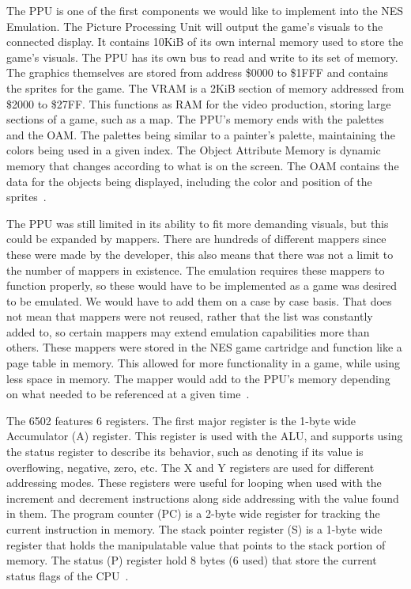 \documentclass[12pt]{article}
\begin{document}
The PPU is one of the first components we would like to implement into the NES Emulation. The Picture Processing Unit will output 
the game's visuals to the connected display. It contains 10KiB of its own internal memory used to store the game's visuals. The PPU has 
its own bus to read and write to its set of memory. The graphics themselves are stored from address \$0000 to \$1FFF
and contains the sprites for the game. The VRAM is a 2KiB section of memory addressed from \$2000 to \$27FF. This 
functions as RAM for the video production, storing large sections of a game, such as a map. The PPU's memory ends 
with the palettes and the OAM. The palettes being similar to a painter's palette, maintaining the colors being used in a given
index. The Object Attribute Memory is dynamic memory that changes according to what is on the screen. The OAM contains
the data for the objects being displayed, including the color and position of the sprites~\cite{PPU}.

The PPU was still limited in its ability to fit more demanding visuals, but this could be expanded by 
mappers. There are hundreds of different mappers since these were made by the developer, this also means that
there was not a limit to the number of mappers in existence. The emulation requires these mappers to function
properly, so these would have to be implemented as a game was desired to be emulated. We would have to add them
on a case by case basis. That does not mean that mappers were not reused, rather that the list was constantly
added to, so certain mappers may extend emulation capabilities more than others. These mappers were stored in the
NES game cartridge and function like a page table in memory. This allowed for more functionality in a game, 
while using less space in memory. The mapper would add to the PPU's memory depending on what needed to be 
referenced at a given time~\cite{mappers}. 

The 6502 features 6 registers. The first major register is the 1-byte wide Accumulator (A) register.
This register is used with the ALU, and supports using the status register to describe its behavior,
such as denoting if its value is overflowing, negative, zero, etc. The X and Y registers are used for
different addressing modes. These registers were useful for looping when used with the increment and 
decrement instructions along side addressing with the value found in them. The program counter (PC) is a 
 2-byte wide register for tracking the current instruction in memory. The stack pointer register (S) is a 
1-byte wide register that holds the manipulatable value that points to the stack portion of memory. The
status (P) register hold 8 bytes (6 used) that store the current status flags of the CPU~\cite{cpu_registers}.
\end{document}
